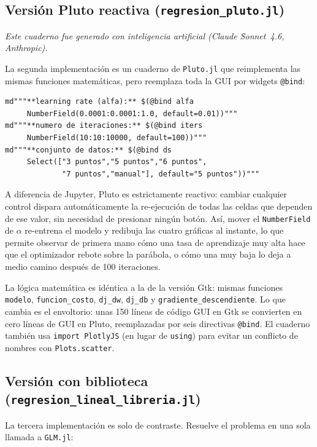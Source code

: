 \documentclass[11pt,a4paper]{article}
\begin{document}
\subsection{Versi\'on Pluto reactiva (\texttt{regresion\_pluto.jl})}

\textit{Este cuaderno fue generado con inteligencia artificial (Claude Sonnet~4.6, Anthropic).}

La segunda implementaci\'on es un cuaderno de \texttt{Pluto.jl} \cite{plutojl} que reimplementa las mismas funciones matem\'aticas, pero reemplaza toda la GUI por widgets \texttt{@bind}:

\begin{lstlisting}
md"""**learning rate (alfa):** $(@bind alfa
     NumberField(0.0001:0.0001:1.0, default=0.01))"""
md"""**numero de iteraciones:** $(@bind iters
     NumberField(10:10:10000, default=100))"""
md"""**conjunto de datos:** $(@bind ds
     Select(["3 puntos","5 puntos","6 puntos",
             "7 puntos","manual"], default="5 puntos"))"""
\end{lstlisting}

A diferencia de Jupyter, Pluto es estrictamente reactivo: cambiar cualquier control dispara autom\'aticamente la re-ejecuci\'on de todas las celdas que dependen de ese valor, sin necesidad de presionar ning\'un bot\'on. As\'i, mover el \texttt{NumberField} de $\alpha$ re-entrena el modelo y redibuja las cuatro gr\'aficas al instante, lo que permite observar de primera mano c\'omo una tasa de aprendizaje muy alta hace que el optimizador rebote sobre la par\'abola, o c\'omo una muy baja lo deja a medio camino despu\'es de 100 iteraciones.

La l\'ogica matem\'atica es id\'entica a la de la versi\'on Gtk: mismas funciones \texttt{modelo}, \texttt{funcion\_costo}, \texttt{dj\_dw}, \texttt{dj\_db} y \texttt{gradiente\_descendiente}. Lo que cambia es el envoltorio: unas 150 l\'ineas de c\'odigo GUI en Gtk se convierten en cero l\'ineas de GUI en Pluto, reemplazadas por seis directivas \texttt{@bind}. El cuaderno tambi\'en usa \texttt{import PlotlyJS} (en lugar de \texttt{using}) para evitar un conflicto de nombres con \texttt{Plots.scatter}.

\subsection{Versi\'on con biblioteca (\texttt{regresion\_lineal\_libreria.jl})}

La tercera implementaci\'on es solo de contraste. Resuelve el problema en una sola llamada a \texttt{GLM.jl}:
\end{document}

